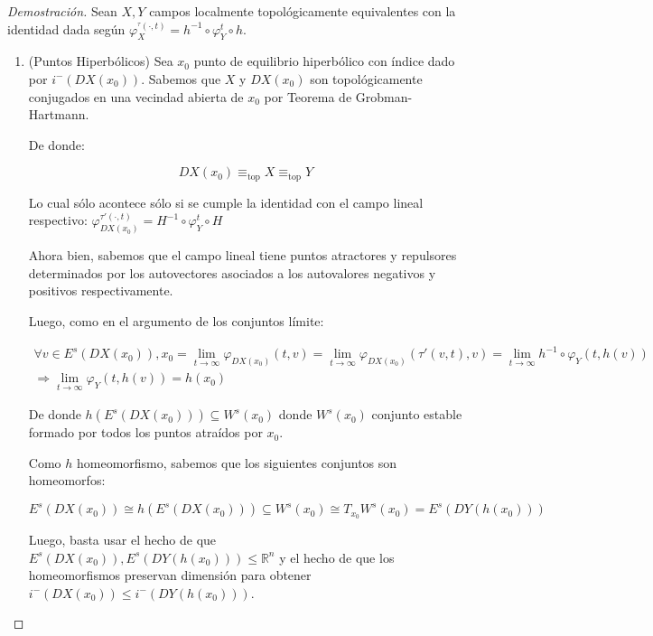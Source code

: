 \begin{proof}[Demostración] Sean $X,Y$ campos localmente topológicamente equivalentes con la identidad dada según $\varphi_X^{^\tau(\cdot,t)} = h^{-1} \circ \varphi_Y^t \circ h$.
	
	
	\begin{enumerate}
		\item (Puntos Hiperbólicos)
		Sea $x_0$ punto de  equilibrio hiperbólico con índice dado por $i^{-}(DX(x_0))$. Sabemos que $X$ y $DX(x_0)$ son topológicamente conjugados en una vecindad abierta de $x_0$ por Teorema de Grobman-Hartmann. 
		
		De donde: 
		
		\begin{equation*}
			DX(x_0) \equiv_{\text{top}} X \equiv_{\text{top}} Y
		\end{equation*}
		
		Lo cual sólo acontece sólo si se cumple la identidad con el campo lineal respectivo: $\varphi_{DX(x_0)}^{\tau'(\cdot,t)} = H^{-1} \circ \varphi_Y^t \circ H$
		
		Ahora bien, sabemos que el campo lineal tiene puntos atractores y repulsores determinados por los autovectores asociados a los autovalores negativos y positivos respectivamente.
		
		Luego, como en el argumento de los conjuntos límite:
		
		\begin{gather*}
			\forall v \in E^s(DX(x_0)), x_0 =\lim_{t \to \infty}\varphi_{DX(x_0)}(t,v)= \lim_{t \to \infty}\varphi_{DX(x_0)}(\tau'(v,t),v) = \lim_{t \to \infty} h^{-1}\circ \varphi_Y(t, h(v))  \\
			\Rightarrow	\lim_{t \to \infty}  \varphi_Y(t, h(v)) = h(x_0) 
		\end{gather*}
		
		De donde $h(E^s(DX(x_0))) \subseteq W^s(x_0)$ donde $W^s(x_0)$ conjunto estable formado por todos los puntos atraídos por $x_0$.
		
		Como $h$ homeomorfismo, sabemos que los siguientes conjuntos son homeomorfos:
		
		\begin{equation*}
			E^s(DX(x_0)) \cong  h(E^s(DX(x_0))) \subseteq   W^s(x_0) \cong T_{x_0}W^s(x_0)= E^s(DY(h(x_0)))
		\end{equation*} 
		
		Luego, basta usar el hecho de que $E^s(DX(x_0)), E^s(DY(h(x_0))) \leq \mathbb{R}^n$ y el hecho de que los homeomorfismos preservan dimensión para obtener $i^{-}(DX(x_0)) \leq i^{-}(DY(h(x_0)))$.
		

\end{enumerate}
\end{proof}
